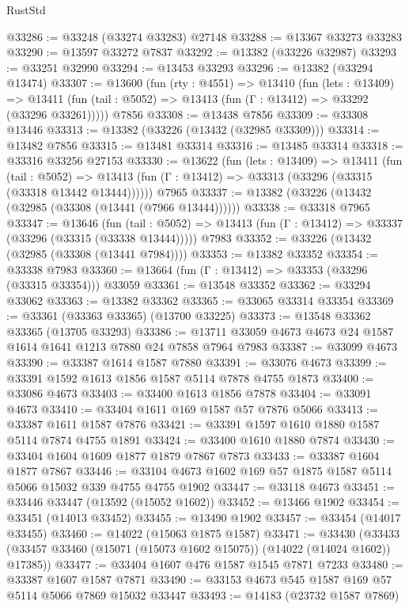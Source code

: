 \begin{lexlean}{RustStd}
\begin{coremodule}
@33286 := @33248 (@33274 @33283) @27148
@33288 := @13367 @33273 @33283
@33290 := @13597 @33272 @7837
@33292 := @13382 (@33226 @32987)
@33293 := @33251 @32990
@33294 := @13453 @33293
@33296 := @13382 (@33294 @13474)
@33307 := @13600
    (fun (rty : @4551) =>
    @13410
      (fun (lets : @13409) =>
      @13411 (fun (tail : @5052) => @13413 (fun (Γ : @13412) => @33292 (@33296 @33261)))))
    @7856
@33308 := @13438 @7856
@33309 := @33308 @13446
@33313 := @13382 (@33226 (@13432 (@32985 @33309)))
@33314 := @13482 @7856
@33315 := @13481 @33314
@33316 := @13485 @33314
@33318 := @33316 @33256 @27153
@33330 := @13622
    (fun (lets : @13409) =>
    @13411
      (fun (tail : @5052) =>
      @13413 (fun (Γ : @13412) => @33313 (@33296 (@33315 (@33318 @13442 @13444))))))
    @7965
@33337 := @13382 (@33226 (@13432 (@32985 (@33308 (@13441 (@7966 @13444))))))
@33338 := @33318 @7965
@33347 := @13646
    (fun (tail : @5052) => @13413 (fun (Γ : @13412) => @33337 (@33296 (@33315 (@33338 @13444)))))
    @7983
@33352 := @33226 (@13432 (@32985 (@33308 (@13441 @7984))))
@33353 := @13382 @33352
@33354 := @33338 @7983
@33360 := @13664 (fun (Γ : @13412) => @33353 (@33296 (@33315 @33354))) @33059
@33361 := @13548 @33352
@33362 := @33294 @33062
@33363 := @13382 @33362
@33365 := @33065 @33314 @33354
@33369 := @33361 (@33363 @33365) (@13700 @33225)
@33373 := @13548 @33362 @33365 (@13705 @33293)
@33386 := @13711 @33059 @4673 @4673 @24 @1587 @1614 @1641 @1213 @7880 @24 @7858 @7964 @7983
@33387 := @33099 @4673
@33390 := @33387 @1614 @1587 @7880
@33391 := @33076 @4673
@33399 := @33391 @1592 @1613 @1856 @1587 @5114 @7878 @4755 @1873
@33400 := @33086 @4673
@33403 := @33400 @1613 @1856 @7878
@33404 := @33091 @4673
@33410 := @33404 @1611 @169 @1587 @57 @7876 @5066
@33413 := @33387 @1611 @1587 @7876
@33421 := @33391 @1597 @1610 @1880 @1587 @5114 @7874 @4755 @1891
@33424 := @33400 @1610 @1880 @7874
@33430 := @33404 @1604 @1609 @1877 @1879 @7867 @7873
@33433 := @33387 @1604 @1877 @7867
@33446 := @33104 @4673 @1602 @169 @57 @1875 @1587 @5114 @5066 @15032 @339 @4755 @4755 @1902
@33447 := @33118 @4673
@33451 := @33446 @33447 (@13592 (@15052 @1602))
@33452 := @13466 @1902
@33454 := @33451 (@14013 @33452)
@33455 := @13490 @1902
@33457 := @33454 (@14017 @33455)
@33460 := @14022 (@15063 @1875 @1587)
@33471 := @33430
    (@33433 (@33457 @33460 (@15071 (@15073 @1602 @15075)) (@14022 (@14024 @1602)) @17385))
@33477 := @33404 @1607 @476 @1587 @1545 @7871 @7233
@33480 := @33387 @1607 @1587 @7871
@33490 := @33153 @4673 @545 @1587 @169 @57 @5114 @5066 @7869 @15032 @33447
@33493 := @14183 (@23732 @1587 @7869)

\end{coremodule}
\end{lexlean}
